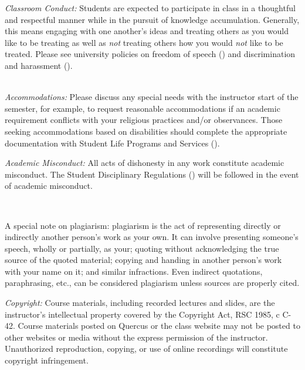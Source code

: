 \documentclass[12pt]{article}
\begin{document}
\begin{sloppypar}
\textit{Classroom Conduct:} Students are expected to participate in class in a thoughtful and respectful manner while in the pursuit of knowledge accumulation. Generally, this means engaging with one another's ideas and treating others as you would like to be treating as well as \textit{not} treating others how you would \textit{not} like to be treated. Please see university policies on freedom of speech () and discrimination and harassment ().
\end{sloppypar}

 \\ 

\textit{Accommodations:} Please discuss any special needs with the instructor start of the semester, for example, to request reasonable accommodations if an academic requirement conflicts with your religious practices and/or observances. Those seeking accommodations based on disabilities should complete the appropriate documentation with Student Life Programs and Services (). \\ 


\begin{sloppypar}
\textit{Academic Misconduct:}
		All acts of dishonesty in any work constitute academic misconduct. The Student Disciplinary Regulations () will be followed in the event of academic misconduct.
	
\\
\end{sloppypar}

\noindent A special note on plagiarism: plagiarism is the act of representing directly or indirectly another person's work as your own. It can involve presenting someone's speech, wholly or partially, as your; quoting without acknowledging the true source of the quoted material; copying and handing in another person's work with your name on it; and similar infractions. Even indirect quotations, paraphrasing, etc., can be considered plagiarism unless sources are properly cited.\\

\item \textit{Copyright:} Course materials, including recorded lectures and slides, are the instructor's intellectual property covered by the Copyright Act, RSC 1985, c C-42. Course materials posted on Quercus or the class website may not be posted to other websites or media without the express permission of the instructor. Unauthorized reproduction, copying, or use of online recordings will constitute copyright infringement.
\newpage
\end{document}
